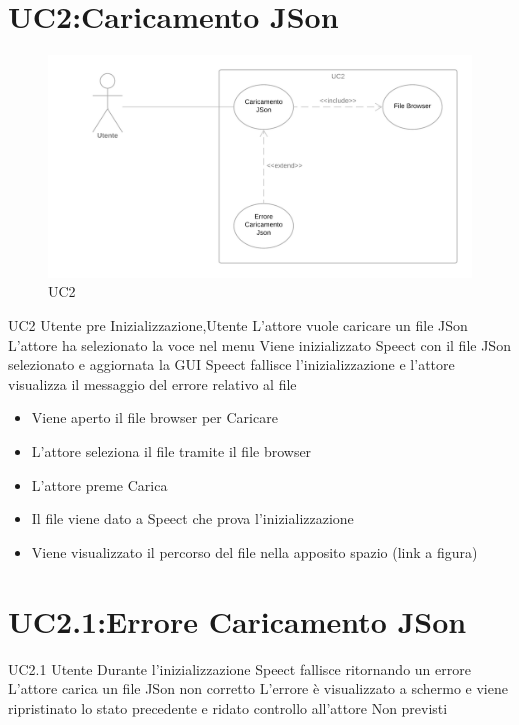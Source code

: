 \documentclass[../AnalisideiRequisiti.tex]{subfiles}
\begin{document}
	\section{UC2:Caricamento JSon}
	\begin{figure}[H]
		\caption{UC2}
		\centering
		\includegraphics[width=\textwidth]{../img/UC02.png}
	\end{figure}
	\UserCase
	{UC2}
	{Utente pre Inizializzazione,Utente}
	{}
	{L'attore vuole caricare un file JSon}
	{L'attore ha selezionato la voce nel menu}
	{Viene inizializzato Speect con il file JSon selezionato e aggiornata la GUI}
	{Speect fallisce l'inizializzazione e l'attore visualizza il messaggio del errore relativo al file }
	{
		\begin{itemize}
			\item{} Viene aperto il file browser per Caricare
			\item{} L'attore seleziona il file tramite il file browser 
			\item{} L'attore preme Carica
			\item{} Il file viene dato a Speect che prova l'inizializzazione
			\item{} Viene visualizzato il percorso del file nella apposito spazio (link a figura)
		\end{itemize}
	}
	\section{UC2.1:Errore Caricamento JSon}
	\UserCase
	{UC2.1}
	{Utente}
	{}
	{Durante l'inizializzazione Speect fallisce ritornando un errore }
	{L'attore carica un file JSon non corretto}
	{L'errore è visualizzato a schermo e viene ripristinato lo stato precedente e ridato controllo all'attore}
	{Non previsti}
	{}

	
\end{document}
